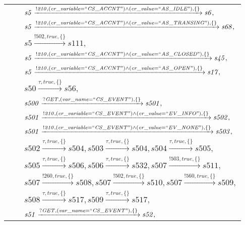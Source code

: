 \begin{tabular}{lcp{350px}}
& & $\mathit{s5}\xrightarrow{\mathit{!210}, \mathit{(cr\_variable = ``CS\_ACCNT") \land (cr\_value = ``AS\_IDLE")}, \{\}}\mathit{s6},$ \\
& & $\mathit{s5}\xrightarrow{\mathit{!210}, \mathit{(cr\_variable = ``CS\_ACCNT") \land (cr\_value = ``AS\_TRANSING")}, \{\}}\mathit{s68},$ \\
& & $\mathit{s5}\xrightarrow{\mathit{!502}, \mathit{true}, \{\}}\mathit{s111},$ \\
& & $\mathit{s5}\xrightarrow{\mathit{!210}, \mathit{(cr\_variable = ``CS\_ACCNT") \land (cr\_value = ``AS\_CLOSED")}, \{\}}\mathit{s45},$ \\
& & $\mathit{s5}\xrightarrow{\mathit{!210}, \mathit{(cr\_variable = ``CS\_ACCNT") \land (cr\_value = ``AS\_OPEN")}, \{\}}\mathit{s17},$ \\
& & $\mathit{s50}\xrightarrow{\mathit{\tau}, \mathit{true}, \{\}}\mathit{s56},$ \\
& & $\mathit{s500}\xrightarrow{\mathit{?GET}, \mathit{(var\_name = ``CS\_EVENT")}, \{\}}\mathit{s501},$ \\
& & $\mathit{s501}\xrightarrow{\mathit{!210}, \mathit{(cr\_variable = ``CS\_EVENT") \land (cr\_value = ``EV\_INFO")}, \{\}}\mathit{s502},$ \\
& & $\mathit{s501}\xrightarrow{\mathit{!210}, \mathit{(cr\_variable = ``CS\_EVENT") \land (cr\_value = ``EV\_NONE")}, \{\}}\mathit{s503},$ \\
& & $\mathit{s502}\xrightarrow{\mathit{\tau}, \mathit{true}, \{\}}\mathit{s504},\mathit{s503}\xrightarrow{\mathit{\tau}, \mathit{true}, \{\}}\mathit{s504},\mathit{s504}\xrightarrow{\mathit{\tau}, \mathit{true}, \{\}}\mathit{s505},$ \\
& & $\mathit{s505}\xrightarrow{\mathit{\tau}, \mathit{true}, \{\}}\mathit{s506},\mathit{s506}\xrightarrow{\mathit{\tau}, \mathit{true}, \{\}}\mathit{s532},\mathit{s507}\xrightarrow{\mathit{!503}, \mathit{true}, \{\}}\mathit{s511},$ \\
& & $\mathit{s507}\xrightarrow{\mathit{!260}, \mathit{true}, \{\}}\mathit{s508},\mathit{s507}\xrightarrow{\mathit{!502}, \mathit{true}, \{\}}\mathit{s510},\mathit{s507}\xrightarrow{\mathit{!560}, \mathit{true}, \{\}}\mathit{s509},$ \\
& & $\mathit{s508}\xrightarrow{\mathit{\tau}, \mathit{true}, \{\}}\mathit{s517},\mathit{s509}\xrightarrow{\mathit{\tau}, \mathit{true}, \{\}}\mathit{s517},$ \\
& & $\mathit{s51}\xrightarrow{\mathit{?GET}, \mathit{(var\_name = ``CS\_EVENT")}, \{\}}\mathit{s52},$ \\
\end{tabular}

